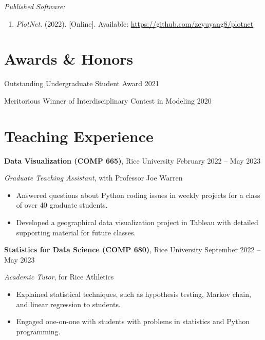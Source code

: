\documentclass[11pt]{article}
\begin{document}
\vspace{\lineskip}

\textit{Published Software:}

\begin{enumerate}[resume]
    \item \label{joe-plotnet} \textit{PlotNet}. (2022). [Online]. Available: \url{https://github.com/zeyuyang8/plotnet}
\end{enumerate}

\section*{Awards \& Honors}

Outstanding Undergraduate Student Award \hfill 2021

Meritorious Winner of Interdisciplinary Contest in Modeling \hfill 2020

\section*{Teaching Experience}

\textbf{Data Visualization (COMP 665)}, Rice University \hfill February 2022 -- May 2023

\textit{Graduate Teaching Assistant}, with Professor Joe Warren 

\begin{itemize}
    \item Answered questions about Python coding issues in weekly projects for a class of over 40 graduate students.
    \item Developed a geographical data visualization project in Tableau with detailed supporting material for future classes.
\end{itemize} 

\vspace{\lineskip}

\textbf{Statistics for Data Science (COMP 680)}, Rice University \hfill September 2022 -- May 2023

\textit{Academic Tutor}, for Rice Athletics

\begin{itemize}
    \item Explained statistical techniques, such as hypothesis testing, Markov chain, and linear regression to students.
    
    \item Engaged one-on-one with students with problems in statistics and Python programming.
\end{itemize} 
\end{document}
